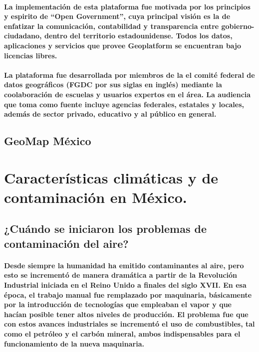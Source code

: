   \paragraph{La implementación de esta plataforma fue motivada por los principios y espirito de ``Open Government''\cite{21}, cuya principal visión es la de enfatizar la comunicación, contabilidad y transparencia entre gobierno-ciudadano, dentro del territorio estadounidense. Todos los datos, aplicaciones y servicios que provee Geoplatform se encuentran bajo licencias libres.}
  \paragraph{La plataforma fue desarrollada por miembros de la el comité federal de datos geográficos (FGDC por sus siglas en inglés) mediante la coolaboración de escuelas y usuarios expertos en el área. La audiencia que toma como fuente incluye agencias federales, estatales y locales, además de sector privado, educativo y al público en general. \cite{19}}
  \subsection{GeoMap México}
    \paragraph{}
\section{Características climáticas y de contaminación en México.}
  \subsection{¿Cuándo se iniciaron los problemas de contaminación del aire?}
    \paragraph {Desde siempre la humanidad ha emitido contaminantes al aire, pero esto se incrementó de manera dramática a partir de la Revolución Industrial iniciada en el Reino Unido a finales del siglo XVII. En esa época, el trabajo manual fue remplazado por maquinaria, básicamente por la introducción de tecnologías que empleaban el vapor y que hacían posible tener altos niveles de producción. El problema fue que con estos avances industriales se incrementó el  uso de combustibles, tal como el petróleo y el carbón mineral, ambos indispensables para el funcionamiento de la nueva maquinaria.}

